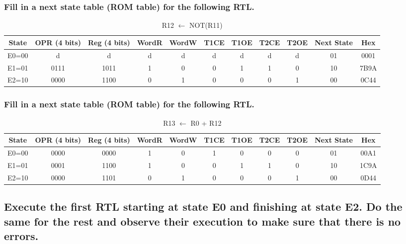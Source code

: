 \documentclass{article}
\begin{document}
		\subsubsection{Fill in a next state table (ROM table) for the following RTL.}
		\begin{table}[h]
			\centering
			\caption{R12 $\leftarrow$ NOT(R11)}
			\vspace{0.2cm}
			\begin{tabular}{|c|c|c|c|c|c|c|c|c|c|c|}
				\hline
				State & OPR (4 bits) & Reg (4 bits) & WordR & WordW & T1CE & T1OE & T2CE & T2OE & Next State & Hex\\
				\hline\hline
				E0=00 & d & d & d & d & d & d & d & d & 01 & 0001\\
				\hline
				E1=01 & 0111 & 1011 & 1 & 0 & 0 & 1 & 1 & 0 & 10 & 7B9A\\
				\hline
				E2=10 & 0000 & 1100 & 0 & 1 & 0 & 0 & 0 & 1 & 00 & 0C44\\
				\hline
			\end{tabular}			
		\end{table}
	
		\subsubsection{Fill in a next state table (ROM table) for the following RTL.}
		\begin{table}[!h]
			\centering
			\caption{R13 $\leftarrow$ R0 + R12}
			\vspace{0.2cm}		 
			\begin{tabular}{|c|c|c|c|c|c|c|c|c|c|c|}
				\hline
				State & OPR (4 bits) & Reg (4 bits) & WordR & WordW & T1CE & T1OE & T2CE & T2OE & Next State & Hex\\
				\hline\hline
				E0=00 & 0000 & 0000 & 1 & 0 & 1 & 0 & 0 & 0 & 01 & 00A1\\
				\hline
				E1=01 & 0001 & 1100 & 1 & 0 & 0 & 1 & 1 & 0 & 10 & 1C9A\\
				\hline
				E2=10 & 0000 & 1101 & 0 & 1 & 0 & 0 & 0 & 1 & 00 & 0D44\\
				\hline
			\end{tabular}
		\end{table}
		
		\pagebreak
		
		\subsection{Execute the first RTL starting at state E0 and finishing at state E2. Do the same for the rest and observe their execution to make sure that there is no errors.}
		
\end{document}

